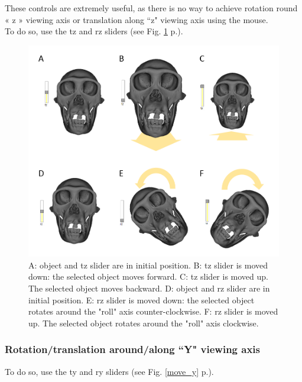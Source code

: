 These controls are extremely useful, as there is no way to achieve rotation round « z » viewing axis or translation along ``z" viewing axis using the
mouse. \\ To do so, use the tz and rz sliders (see Fig. \ref{move_z} p.\pageref{move_z}).


\begin{figure}
  \centering
  \includegraphics[scale=0.45]{images/06/objects/move_objects_z.png} 
	\caption{A: object and tz slider are in initial position. B: tz slider is moved down: the selected object moves forward. C: tz slider is moved up. The selected object moves backward. D: object and rz slider are in initial position. E: rz slider is moved down: the selected object rotates around the "roll" axis counter-clockwise. F: rz slider is moved up. The selected object rotates around the "roll" axis clockwise.}
\label{move_z}
 
\end{figure}



\subsubsection{Rotation/translation around/along ``Y" viewing axis}

To do so, use the ty and ry sliders (see Fig. \ref{move_y} p.\pageref{move_y}).

